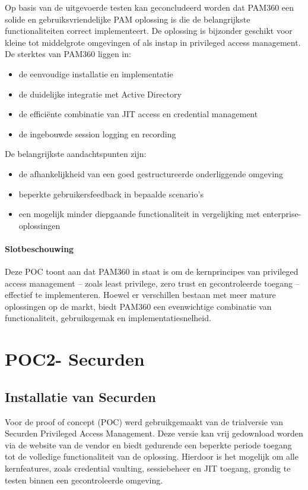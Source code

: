 Op basis van de uitgevoerde testen kan geconcludeerd worden dat PAM360 een solide en gebruiksvriendelijke PAM oplossing is die de belangrijkste functionaliteiten correct implementeert. De oplossing is bijzonder geschikt voor kleine tot middelgrote omgevingen of als instap in privileged access management.
De sterktes van PAM360 liggen in:
\begin{itemize}
	\item de eenvoudige installatie en implementatie
	\item de duidelijke integratie met Active Directory 
	\item de efficiënte combinatie van JIT access en credential management 
	\item de ingebouwde session logging en recording 
\end{itemize}
De belangrijkste aandachtspunten zijn:
\begin{itemize}
	\item de afhankelijkheid van een goed gestructureerde onderliggende omgeving 
	\item beperkte gebruikersfeedback in bepaalde scenario’s 
	\item een mogelijk minder diepgaande functionaliteit in vergelijking met enterprise-oplossingen 
\end{itemize}
\paragraph{Slotbeschouwing}
Deze POC toont aan dat PAM360 in staat is om de kernprincipes van privileged access management – zoals least privilege, zero trust en gecontroleerde toegang – effectief te implementeren. Hoewel er verschillen bestaan met meer mature oplossingen op de markt, biedt PAM360 een evenwichtige combinatie van functionaliteit, gebruiksgemak en implementatiesnelheid.
\section{POC2- Securden}
\subsection{Installatie van Securden}
Voor de proof of concept (POC) werd gebruikgemaakt van de trialversie van Securden Privileged Access Management. Deze versie kan vrij gedownload worden via de website van de vendor en biedt gedurende een beperkte periode toegang tot de volledige functionaliteit van de oplossing. Hierdoor is het mogelijk om alle kernfeatures, zoals credential vaulting, sessiebeheer en JIT toegang, grondig te testen binnen een gecontroleerde omgeving.

